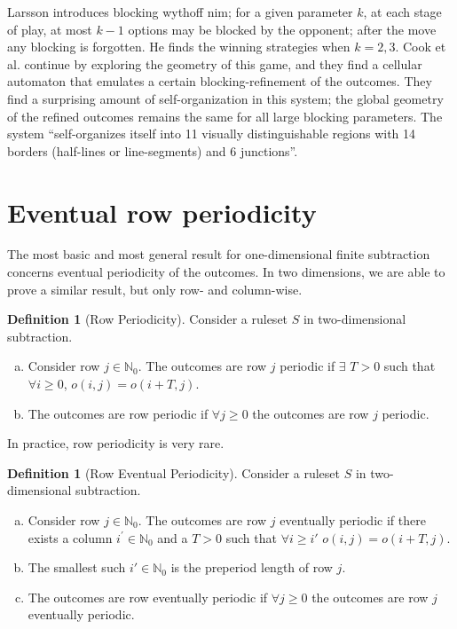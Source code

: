 \documentclass{amsart}
\theoremstyle{plain}
\theoremstyle{definition}
\newtheorem{defi}[thm]{Definition}
\newcommand{\nz}{\mathbb N_0}
\renewcommand{\ge}{\geqslant}
\begin{document}
Larsson \cite{larsson2011blocking} introduces {\sc blocking wythoff nim}; for a given parameter $k$, at each stage of play, at most $k-1$ options may be blocked by the opponent; after the move any blocking is forgotten. He finds the winning strategies when $k=2,3$. Cook et al. \cite{Cook2017} continue by exploring the geometry of this game, and they find a cellular automaton that emulates a certain blocking-refinement of the outcomes. They find a surprising amount of self-organization in this system; the global geometry of the refined outcomes remains the same for all large blocking parameters. The system ``self-organizes itself into 11 visually distinguishable regions with 14 borders (half-lines or line-segments) and 6 junctions''.   



\section{Eventual row periodicity}
\label{Sec:rowperiodicity}
The most basic and most general result for {\sc one-dimensional finite subtraction} concerns eventual periodicity of the outcomes. In two dimensions, we are able to prove a similar result, but only row- and  column-wise. 

\begin{defi}[Row Periodicity]
Consider a ruleset $S$ in  {\sc two-dimensional subtraction}. 
\begin{enumerate}[a)]
\item Consider row $j\in \nz$.  The outcomes are row $j$ periodic  if  $\exists$ $T > 0$ such that  $\forall i \ge 0$, $ o(i,j)= o(i+T,j)$. 
 \item  The outcomes are row periodic if  $\forall j \ge 0$  the outcomes are row $j$ periodic.
\end{enumerate}
\end{defi}
In practice, row periodicity is very rare.

\begin{defi}[Row Eventual Periodicity]
\label{def_eventualperiodic}
Consider a ruleset $S$ in {\sc two-dimensional subtraction}.
\begin{enumerate}[a)]
    \item  Consider row $j\in \nz$. The outcomes are row $j$ eventually periodic if there exists a column  $i^{'}\in \nz $  and a $T >0$ such that $\forall i \ge i'$
    $
    o(i,j) = o(i+T, j).
    $  
    \item The smallest such $i'\in \nz $ is the preperiod length of row $j$.
    \item The outcomes are row eventually  periodic if  $\forall j \ge 0$ the outcomes are row $j$  eventually periodic.
\end{enumerate}
\end{defi}  
 
\end{document}
